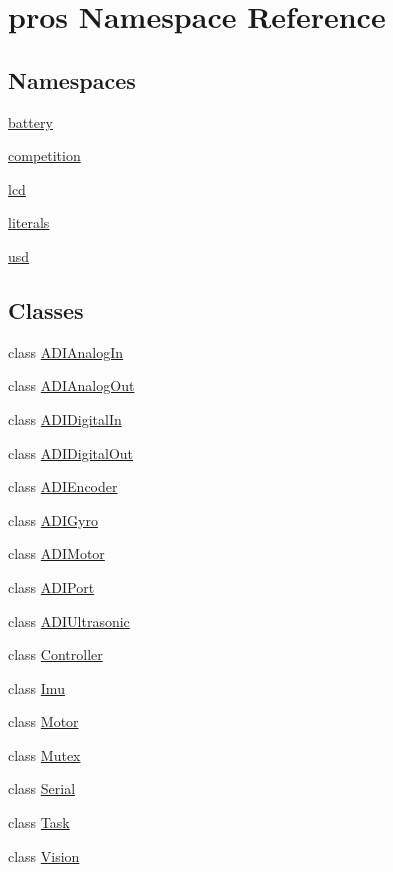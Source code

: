 \hypertarget{namespacepros}{}\section{pros Namespace Reference}
\label{namespacepros}
\subsection*{Namespaces}
\begin{DoxyCompactItemize}
\item 
 \hyperlink{namespacepros_1_1battery}{battery}
\item 
 \hyperlink{namespacepros_1_1competition}{competition}
\item 
 \hyperlink{namespacepros_1_1lcd}{lcd}
\item 
 \hyperlink{namespacepros_1_1literals}{literals}
\item 
 \hyperlink{namespacepros_1_1usd}{usd}
\end{DoxyCompactItemize}
\subsection*{Classes}
\begin{DoxyCompactItemize}
\item 
class \hyperlink{classpros_1_1ADIAnalogIn}{A\+D\+I\+Analog\+In}
\item 
class \hyperlink{classpros_1_1ADIAnalogOut}{A\+D\+I\+Analog\+Out}
\item 
class \hyperlink{classpros_1_1ADIDigitalIn}{A\+D\+I\+Digital\+In}
\item 
class \hyperlink{classpros_1_1ADIDigitalOut}{A\+D\+I\+Digital\+Out}
\item 
class \hyperlink{classpros_1_1ADIEncoder}{A\+D\+I\+Encoder}
\item 
class \hyperlink{classpros_1_1ADIGyro}{A\+D\+I\+Gyro}
\item 
class \hyperlink{classpros_1_1ADIMotor}{A\+D\+I\+Motor}
\item 
class \hyperlink{classpros_1_1ADIPort}{A\+D\+I\+Port}
\item 
class \hyperlink{classpros_1_1ADIUltrasonic}{A\+D\+I\+Ultrasonic}
\item 
class \hyperlink{classpros_1_1Controller}{Controller}
\item 
class \hyperlink{classpros_1_1Imu}{Imu}
\item 
class \hyperlink{classpros_1_1Motor}{Motor}
\item 
class \hyperlink{classpros_1_1Mutex}{Mutex}
\item 
class \hyperlink{classpros_1_1Serial}{Serial}
\item 
class \hyperlink{classpros_1_1Task}{Task}
\item 
class \hyperlink{classpros_1_1Vision}{Vision}
\end{DoxyCompactItemize}

